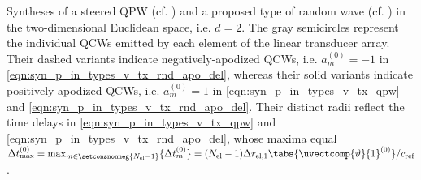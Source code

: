 %
{%
 Syntheses of
 a steered \acf{QPW}
 (cf. ) and
 a proposed type of
 random wave
 (cf. ) in
 the two-dimensional Euclidean space, i.e. $d = 2$.
 The gray semicircles represent
 the individual \acfp{QCW} emitted by
 each element of
 the linear transducer array.
 Their dashed variants indicate
 negatively-apodized \acp{QCW}, i.e.
 $a_{m}^{(0)} = - 1$ in
 \eqref{eqn:syn_p_in_types_v_tx_rnd_apo_del}, whereas
 their solid variants indicate
 positively-apodized \acp{QCW}, i.e.
 $a_{m}^{(0)} = 1$ in
 \eqref{eqn:syn_p_in_types_v_tx_qpw} and
 \eqref{eqn:syn_p_in_types_v_tx_rnd_apo_del}.
 Their distinct radii reflect
 the time delays in
 \eqref{eqn:syn_p_in_types_v_tx_qpw} and
 \eqref{eqn:syn_p_in_types_v_tx_rnd_apo_del}, whose
 maxima equal
 $\Delta t_{\text{max}}^{(0)} = \max_{ m \in \setconsnonneg{ N_{\text{el}} - 1 } }\{ \Delta t_{m}^{(0)} \} = ( N_{\text{el}} - 1 ) \Delta r_{\text{el}, 1} \tabs{ \uvectcomp{ \vartheta }{ 1 }^{(0)} } / c_{\text{ref}}$. %
}
